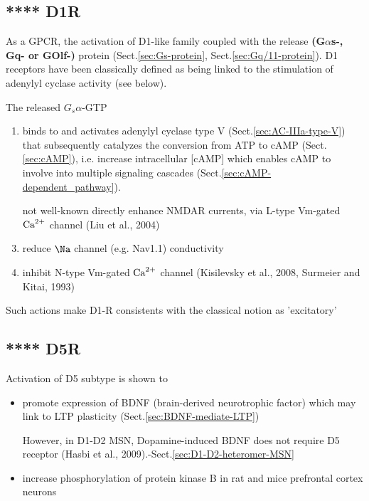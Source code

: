 \subsection{**** D1R}
\label{sec:D1R}

As a GPCR, the activation of D1-like family coupled with the release {\bf
(G$\alpha$s-, Gq- or GOlf-)} protein  (Sect.\ref{sec:Gs-protein},
 Sect.\ref{sec:Gq/11-protein}).   D1 receptors have been classically
defined as being linked to the stimulation of adenylyl cyclase activity (see
below).
 
The released $G_s\alpha$-GTP 
\begin{enumerate}
  
  \item   binds to and activates  adenylyl cyclase type V
  (Sect.\ref{sec:AC-IIIa-type-V}) that subsequently catalyzes the conversion from ATP to
  cAMP (Sect.\ref{sec:cAMP}), i.e. increase  intracellular [cAMP] which enables
  cAMP to involve into multiple signaling cascades
  (Sect.\ref{sec:cAMP-dependent_pathway}).
  
  \item [not well-known] directly enhance NMDAR currents, via L-type Vm-gated
  ${\text{Ca}^{2+}}$ channel (Liu et al., 2004)
  
  \item reduce $\Na$ channel (e.g. Nav1.1) conductivity
  \item inhibit N-type Vm-gated ${\text{Ca}^{2+}}$ channel (Kisilevsky et al., 2008,
  Surmeier and Kitai, 1993)
  
\end{enumerate}
Such actions make D1-R consistents with the classical notion as 'excitatory'
 


 
\subsection{**** D5R}
\label{sec:D5R}

Activation of D5 subtype is shown to 
\begin{itemize}

  \item promote expression of BDNF (brain-derived
neurotrophic factor)  which may link to LTP plasticity
(Sect.\ref{sec:BDNF-mediate-LTP})

However, in D1-D2 MSN, Dopamine-induced BDNF does not require D5 receptor
(Hasbi et al., 2009).-Sect.\ref{sec:D1-D2-heteromer-MSN}

  \item increase phosphorylation of protein kinase B in rat and mice prefrontal
  cortex neurons 
\end{itemize}


